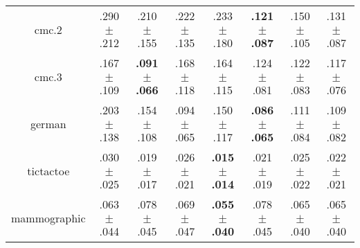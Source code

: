 \begin{tabular}{|c|ccccccc|}
cmc.2 & .290$^{\phantom{\dag}}\pm^{\phantom{\dag}}$.212\cellcolor{red!40} & .210$^{\phantom{\dag}}\pm^{\phantom{\dag}}$.155\cellcolor{red!2} & .222$^{\phantom{\dag}}\pm^{\phantom{\dag}}$.135\cellcolor{red!7} & .233$^{\phantom{\dag}}\pm^{\phantom{\dag}}$.180\cellcolor{red!12} & \textbf{.121$^{\phantom{\dag}}\pm^{\phantom{\dag}}$.087}\cellcolor{green!40} & .150$^{\phantom{\dag}}\pm^{\phantom{\dag}}$.105\cellcolor{green!26} & .131$^{\phantom{\dag}}\pm^{\phantom{\dag}}$.087\cellcolor{green!35} \\
cmc.3 & .167$^{\phantom{\dag}}\pm^{\phantom{\dag}}$.109\cellcolor{red!38} & \textbf{.091$^{\phantom{\dag}}\pm^{\phantom{\dag}}$.066}\cellcolor{green!40} & .168$^{\phantom{\dag}}\pm^{\phantom{\dag}}$.118\cellcolor{red!40} & .164$^{\phantom{\dag}}\pm^{\phantom{\dag}}$.115\cellcolor{red!35} & .124$^{\phantom{\dag}}\pm^{\phantom{\dag}}$.081\cellcolor{green!5} & .122$^{\phantom{\dag}}\pm^{\phantom{\dag}}$.083\cellcolor{green!8} & .117$^{\phantom{\dag}}\pm^{\phantom{\dag}}$.076\cellcolor{green!13} \\
german & .203$^{\phantom{\dag}}\pm^{\phantom{\dag}}$.138\cellcolor{red!40} & .154$^{\phantom{\dag}}\pm^{\phantom{\dag}}$.108\cellcolor{red!6} & .094$^{\phantom{\dag}}\pm^{\phantom{\dag}}$.065\cellcolor{green!34} & .150$^{\phantom{\dag}}\pm^{\phantom{\dag}}$.117\cellcolor{red!3} & \textbf{.086$^{\phantom{\dag}}\pm^{\phantom{\dag}}$.065}\cellcolor{green!40} & .111$^{\phantom{\dag}}\pm^{\phantom{\dag}}$.084\cellcolor{green!22} & .109$^{\phantom{\dag}}\pm^{\phantom{\dag}}$.082\cellcolor{green!24} \\
tictactoe & .030$^{\phantom{\dag}}\pm^{\phantom{\dag}}$.025\cellcolor{red!40} & .019$^{\phantom{\dag}}\pm^{\phantom{\dag}}$.017\cellcolor{green!14} & .026$^{\phantom{\dag}}\pm^{\phantom{\dag}}$.021\cellcolor{red!19} & \textbf{.015$^{\phantom{\dag}}\pm^{\phantom{\dag}}$.014}\cellcolor{green!40} & .021$^{\phantom{\dag}}\pm^{\phantom{\dag}}$.019\cellcolor{green!6} & .025$^{\phantom{\dag}}\pm^{\phantom{\dag}}$.022\cellcolor{red!11} & .022$^{\phantom{\dag}}\pm^{\phantom{\dag}}$.021\cellcolor{green!0} \\
mammographic & .063$^{\phantom{\dag}}\pm^{\phantom{\dag}}$.044\cellcolor{green!12} & .078$^{\phantom{\dag}}\pm^{\phantom{\dag}}$.045\cellcolor{red!38} & .069$^{\phantom{\dag}}\pm^{\phantom{\dag}}$.047\cellcolor{red!7} & \textbf{.055$^{\phantom{\dag}}\pm^{\phantom{\dag}}$.040}\cellcolor{green!40} & .078$^{\phantom{\dag}}\pm^{\phantom{\dag}}$.045\cellcolor{red!40} & .065$^{\phantom{\dag}}\pm^{\phantom{\dag}}$.040\cellcolor{green!5} & .065$^{\phantom{\dag}}\pm^{\phantom{\dag}}$.040\cellcolor{green!5} \\

\end{tabular}
